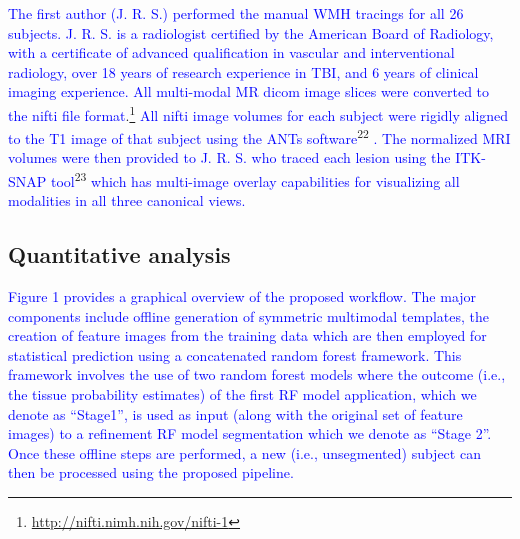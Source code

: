 \documentclass[11pt,]{article}
\let\rmarkdownfootnote\footnote%
\def\footnote{\protect\rmarkdownfootnote}
\begin{document}
\textcolor{blue}{The first author (J. R. S.) performed the manual WMH tracings for all 26
subjects.  J. R. S. is a radiologist certified by the American Board of Radiology, with a certificate of advanced qualification in vascular and interventional radiology, over 18 years of research experience in TBI, and 6 years of clinical imaging experience.  All
multi-modal MR dicom image slices were converted to the nifti file format}.\footnote{\url{http://nifti.nimh.nih.gov/nifti-1}}
\textcolor{blue}{All nifti image volumes for each subject were rigidly aligned to the T1 image of that subject using the ANTs software}\textsuperscript{22}
\textcolor{blue}{.  The normalized MRI volumes were then provided to
J. R. S. who traced each lesion using the ITK-SNAP tool}\textsuperscript{23}
\textcolor{blue}{
which has multi-image overlay capabilities for visualizing all modalities in all three
canonical views.}

\subsection{Quantitative analysis}\label{quantitative-analysis}

\textcolor{blue}{Figure 1 provides a graphical overview of the proposed workflow.  The major components
include offline generation of symmetric multimodal templates, the creation of
feature images from the training data which are then employed for statistical
prediction using a concatenated random forest framework.  This framework involves
the use of two random forest models where the outcome (i.e., the tissue
probability estimates) of the first RF model application,
which we denote as ``Stage1'', is used as input (along with the original set of
feature images) to a refinement RF model segmentation which we denote as ``Stage 2''.
Once these offline steps
are performed, a new (i.e., unsegmented) subject can then be processed using the proposed pipeline.}
\end{document}
